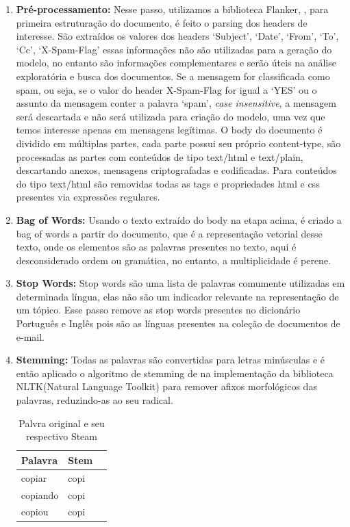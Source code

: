 \documentclass[12pt,a4paper]{article}
\begin{document}
\begin{enumerate}
\item \textbf{Pré-processamento:} Nesse passo, utilizamos a biblioteca Flanker, , para primeira estruturação do documento, é feito o parsing dos headers de interesse.
 São extraídos os valores dos headers ‘Subject’, ‘Date’, ‘From’, ‘To’, ‘Cc’, ‘X-Spam-Flag’ essas informações não são utilizadas para a geração do modelo,
 no entanto são informações complementares e serão úteis na análise exploratória e busca dos documentos. Se a mensagem for classificada como spam, ou seja, 
 se o valor do header X-Spam-Flag for igual a ‘YES’ ou o assunto da mensagem conter a palavra ‘spam’, \textit{case insensitive}, a mensagem será descartada e não será utilizada para criação do modelo,
 uma vez que temos interesse apenas em mensagens legítimas. O body do documento é dividido em múltiplas partes, cada parte possui seu próprio content-type,
 são processadas as partes com conteúdos de tipo text/html e text/plain, descartando anexos, mensagens criptografadas e codificadas. 
 Para conteúdos do tipo text/html são removidas todas as tags e propriedades html e css presentes via expressões regulares.
\item \textbf{Bag of Words:} Usando o texto extraído do body na etapa acima, é criado a bag of words a partir do documento, que é a representação vetorial desse texto,
 onde os elementos são as palavras presentes no texto, aqui é desconsiderado ordem ou gramática, no entanto, a multiplicidade é perene.
\item \textbf{Stop Words:} Stop words são uma lista de palavras comumente utilizadas em determinada língua, elas não são um indicador relevante na representação de um tópico.
 Esse passo remove as stop words presentes no dicionário Português e Inglês pois são as línguas presentes na coleção de documentos de e-mail.
\item \textbf{Stemming:} Todas as palavras são convertidas para letras minúsculas e é então aplicado o algoritmo de stemming de 
 na implementação da biblioteca NLTK(Natural Language Toolkit)  para remover afixos morfológicos das palavras, reduzindo-as ao seu radical.


\begin{table}[h]
  \centering
  \begin{tabular}{l l l}
  Palavra		&Stem &\\
  \hline
  copiar		&copi &\\
  copiando		&copi &\\
  copiou		&copi &\\
  \hline
  \end{tabular}
  \caption{Palvra original e seu respectivo Steam}
\end{table}


\end{enumerate}
\end{document}
